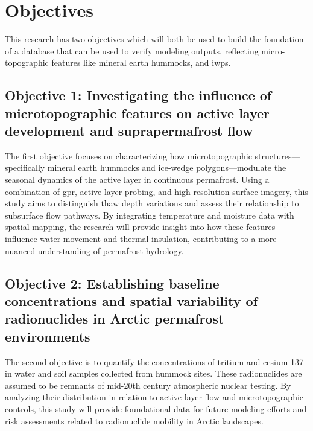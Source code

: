 \chapter{Objectives}
This research has two objectives which will both be used to build the foundation of a database that can be used to verify modeling outputs, reflecting micro-topographic features like mineral earth hummocks, and \glspl{iwp}. 
\section{Objective 1: Investigating the influence of microtopographic features on active layer development and suprapermafrost flow}
The first objective focuses on characterizing how microtopographic structures—specifically mineral earth hummocks and ice-wedge polygons—modulate the seasonal dynamics of the active layer in continuous permafrost. 
Using a combination of \gls{gpr}, active layer probing, and high-resolution surface imagery, this study aims to distinguish thaw depth variations and assess their relationship to subsurface flow pathways. 
By integrating temperature and moisture data with spatial mapping, the research will provide insight into how these features influence water movement and thermal insulation, contributing to a more nuanced understanding of permafrost hydrology.
\section{Objective 2: Establishing baseline concentrations and spatial variability of radionuclides in Arctic permafrost environments}
The second objective is to quantify the concentrations of tritium and cesium-137 in water and soil samples collected from hummock sites. 
These radionuclides are assumed to be remnants of mid-20th century atmospheric nuclear testing. 
By analyzing their distribution in relation to active layer flow and microtopographic controls, this study will provide foundational data for future modeling efforts and risk assessments related to radionuclide mobility in Arctic landscapes.
